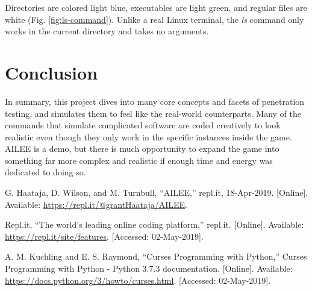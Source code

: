 \documentclass[conference]{IEEEtran}
\begin{document}
Directories are colored light blue, executables are light green, and regular files are white (Fig. \ref{fig:ls-command}). Unlike a real Linux terminal, the \textit{ls} command only works in the current directory and takes no arguments. 

\section{Conclusion}
In summary, this project dives into many core concepts and facets of penetration testing, and simulates them to feel like the real-world counterparts. Many of the commands that simulate complicated software are coded creatively to look realistic even though they only work in the specific instances inside the game. AILEE is a demo, but there is much opportunity to expand the game into something far more complex and realistic if enough time and energy was dedicated to doing so.

\begin{thebibliography}{00}
 G. Haataja, D. Wilson, and M. Turnbull, “AILEE,” repl.it, 18-Apr-2019. [Online]. Available: \url{https://repl.it/@grantHaataja/AILEE}.

 Repl.it, ``The world's leading online coding platform,'' repl.it. [Online]. Available: \url{https://repl.it/site/features}. [Accessed: 02-May-2019].

 A. M. Kuchling and E. S. Raymond, ``Curses Programming with Python,'' Curses Programming with Python - Python 3.7.3 documentation. [Online]. Available: \url{https://docs.python.org/3/howto/curses.html}. [Accessed: 02-May-2019].

\end{thebibliography}
\end{document}
